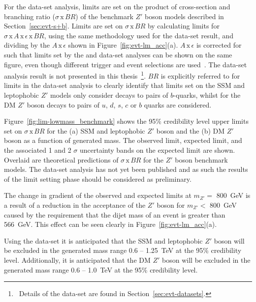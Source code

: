For the \lm{} data-set analysis, limits are set on the product of cross-section and branching ratio ($\sigma\,\text{x}\,\mathit{BR}$)
of the benchmark $Z'$ boson models described in Section~\ref{sec:evt-s+b}.
Limits are set on $\sigma\,\text{x}\,\mathit{BR}$ by calculating limits for $\sigma\,\text{x}\,\mathit{A}\,\text{x}\,\epsilon\,\text{x}\,\mathit{BR}$,
using the same methodology used for the \summer{} data-set result,
and dividing by the $\mathit{A}\,\text{x}\,\epsilon$ shown in Figure~\ref{fig:evt-lm_acc}(a).
$\mathit{A}\,\text{x}\,\epsilon$ is corrected for such that limits set by the \lm{} and \hm{} data-set analyses can be shown on the same figure,
even though different trigger and event selections are used~\cite{dibjet-full_int}. The \hm{} data-set analysis result is not presented in this thesis~\footnote{\ Details
  of the \hm{} data-set are found in Section~\ref{sec:evt-datasets}.}.
$\mathit{BR}$ is explicitly referred to for limits in the \lm{} data-set analysis to clearly identify that
limits set on the SSM and leptophobic $Z'$ models only consider decays to pairs of $b$-quarks,
whilst for the DM $Z'$ boson decays to pairs of $u$, $d$, $s$, $c$ or $b$ quarks are considered.

Figure~\ref{fig:lim-lowmass_benchmark} shows the
95\% credibility level upper limits set on $\sigma\,\text{x}\,\mathit{BR}$
for the (a) SSM and leptophobic $Z'$ boson
and the (b)  DM $Z'$ boson as a function of generated mass.
The observed limit, expected limit, and the associated 1 and 2 $\sigma$ uncertainty bands on the expected limit are shown.
Overlaid are theoretical predictions of $\sigma\,\text{x}\,\mathit{BR}$ for the
$Z'$ boson benchmark models.
The \lm{} data-set analysis has not yet been published and as such the results of the limit setting phase should be considered as preliminary.

The change in gradient of the observed and expected limits at $m_{Z'} =$ 800~GeV
is a result of a reduction in the acceptance of the $Z'$ boson for $m_{Z'} <$ 800~GeV
caused by the requirement that the dijet mass of an event is greater than 566~GeV.
This effect can be seen clearly in Figure~\ref{fig:evt-lm_acc}(a).

Using the \lm{} data-set it is anticipated that the SSM and leptophobic $Z'$ boson
will be excluded in the generated mass range 0.6 -- 1.25~TeV at the 95\% credibility level.
Additionally, it is anticipated that the DM $Z'$ boson will be excluded in the generated mass range
0.6 -- 1.0~TeV  at the 95\% credibility level.

